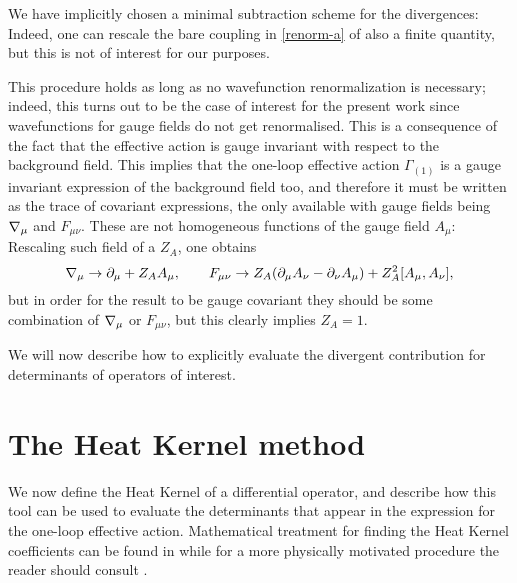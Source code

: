 

We have implicitly chosen a minimal subtraction scheme for the divergences: Indeed, one can rescale the bare coupling in \eqref{renorm-a} of also a finite quantity, but this is not of interest for our purposes.


This procedure holds as long as no wavefunction renormalization is necessary; indeed, this turns out to be the case of interest for the present work since wavefunctions for gauge fields do not get renormalised. 
This is a consequence of the fact that the effective action is gauge invariant with respect to the background field. This implies that the one-loop effective action $\Gamma_{(1)}$ is a gauge invariant expression of the background field too, and therefore it must be written as the trace of covariant expressions,  the only available with gauge fields being ${ \mathcal{\nabla} }_\mu$ and $F_{\mu\nu}$. These are not homogeneous functions of the gauge field $A_\mu$: Rescaling such field of a  $Z_A$, one obtains
\begin{equation}
{ \mathcal{\nabla} }_\mu \rightarrow \partial_\mu + Z_A A_\mu,
\hspace{2em}
F_{\mu\nu} \rightarrow Z_A (\partial_\mu A_\nu - \partial_\nu A_\mu) + Z_A^2 [A_\mu,A_\nu],
\end{equation}
but in order for the result to be gauge covariant they should be some combination of ${ \mathcal{\nabla} }_\mu$ or $F_{\mu\nu}$, but this clearly implies $Z_A = 1$.



We will now describe how to explicitly evaluate the divergent contribution for determinants of operators of interest.



\section{The Heat Kernel method}


We now define the Heat Kernel of a differential operator, and describe how this tool can be used to evaluate the determinants that appear in the expression for the one-loop effective action. Mathematical treatment for finding the Heat Kernel coefficients can be found in \cite{Vassilevich, gilkey} while for a more physically motivated procedure  the reader should consult \cite{dewitt, Fradkin:1981iu}.



